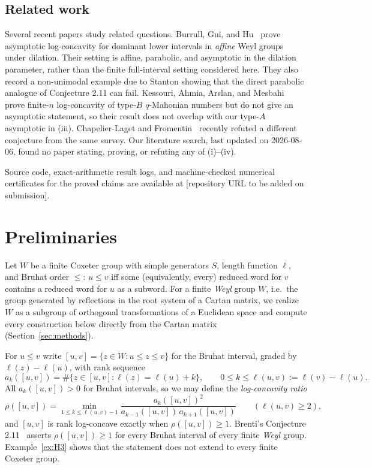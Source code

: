 \documentclass[11pt]{amsart}
\theoremstyle{plain}
\theoremstyle{definition}
\theoremstyle{remark}
\newcommand{\W}{W}
\begin{document}
\subsection*{Related work} Several recent papers study related questions.
Burrull, Gui, and Hu~\cite{burrull-gui-hu} prove asymptotic
log-concavity for dominant lower intervals in \emph{affine} Weyl groups
under dilation. Their setting is affine, parabolic, and asymptotic in the
dilation parameter, rather than the finite full-interval setting considered
here. They also record a non-unimodal example due to Stanton showing that
the direct parabolic analogue of Conjecture 2.11 can fail. Kessouri, Ahmia,
Arslan, and Mesbahi~\cite{kessouri2024} prove finite-$n$ log-concavity of
type-$B$ $q$-Mahonian numbers but do not give an asymptotic statement, so
their result does not overlap with our type-$A$ asymptotic in (iii). Chapelier-Laget and Fromentin~\cite{chapelier-fromentin} recently refuted
a different conjecture from the same survey. Our literature search, last
updated on 2026-08-06, found no paper stating, proving, or refuting any of
(i)--(iv).

Source code, exact-arithmetic result logs, and machine-checked numerical
certificates for the proved claims are available at
[repository URL to be added on submission].

\section{Preliminaries}
\label{sec:prelim}

Let $\W$ be a finite Coxeter group with simple generators $S$, length
function $\ell$, and Bruhat order $\le$: $u\le v$ iff some (equivalently,
every) reduced word for $v$ contains a reduced word for $u$ as a subword.
For a finite \emph{Weyl} group $\W$, i.e.\ the group generated by
reflections in the root system of a Cartan matrix, we realize $\W$ as a
subgroup of orthogonal transformations of a Euclidean space and compute
every construction below directly from the Cartan matrix
(Section~\ref{sec:methods}).

For $u\le v$ write $[u,v]=\{z\in \W : u\le z\le v\}$ for the Bruhat interval,
graded by $\ell(z)-\ell(u)$, with rank sequence
\[
a_k([u,v]) = \#\{z\in [u,v] : \ell(z)=\ell(u)+k\}, \qquad 0\le k \le
\ell(u,v):=\ell(v)-\ell(u).
\]
All $a_k([u,v])>0$ for Bruhat intervals, so we may define the
\emph{log-concavity ratio}
\[
\rho([u,v]) = \min_{1\le k\le \ell(u,v)-1} \frac{a_k([u,v])^2}{a_{k-1}([u,v])\,
a_{k+1}([u,v])} \qquad (\ell(u,v)\ge 2),
\]
and $[u,v]$ is rank log-concave exactly when $\rho([u,v])\ge 1$. Brenti's Conjecture 2.11~\cite{brenti2024open} asserts
$\rho([u,v])\ge 1$ for every Bruhat interval of every finite \emph{Weyl}
group. Example~\ref{ex:H3} shows that the statement does not extend to
every finite Coxeter group.
\end{document}
